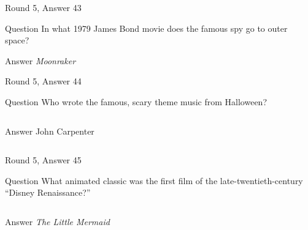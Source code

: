 \documentclass[11pt]{beamer}
\begin{document}
\begin{frame}[t]{Round 5, Answer 43}
  \vspace{2em}
  \begin{block}{Question}
    In what 1979 James Bond movie does the famous spy go to outer space?
  \end{block}
  \pause{}
  \begin{block}{Answer}
    \emph{Moonraker}
  \end{block}
\end{frame}


\begin{frame}[t]{Round 5, Answer 44}
  \vspace{2em}
  \begin{block}{Question}
    Who wrote the famous, scary theme music from Halloween?
  \end{block}
  \pause{}
  \begin{columns}[T,totalwidth=\linewidth]
    \begin{column}{0.35\linewidth}
      \begin{block}{Answer}
        John Carpenter
      \end{block}
    \end{column}
    \begin{column}{0.6\linewidth}
      \begin{center}
        \texttt{[image: \{Images/halloween]}.jpg}
      \end{center}
    \end{column}
  \end{columns}
\end{frame}


\begin{frame}[t]{Round 5, Answer 45}
  \vspace{2em}
  \begin{block}{Question}
    What animated classic was the first film of the late-twentieth-century ``Disney Renaissance?''
  \end{block}
  \pause{}
  \begin{columns}[T,totalwidth=\linewidth]
    \begin{column}{0.35\linewidth}
      \begin{block}{Answer}
        \emph{The Little Mermaid}
      \end{block}
    \end{column}
    \begin{column}{0.6\linewidth}
      \begin{center}
        \texttt{[image: \{Images/littlemermaid]}.jpeg}
      \end{center}
    \end{column}
  \end{columns}
\end{frame}
\end{document}
